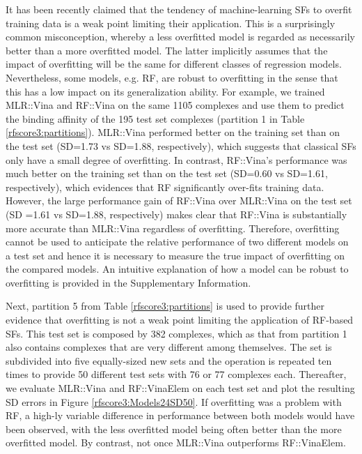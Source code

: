 It has been recently claimed \citep{1372} that the tendency of machine-learning SFs to overfit training data is a weak point limiting their application. This is a surprisingly common misconception, whereby a less overfitted model is regarded as necessarily better than a more overfitted model. The latter implicitly assumes that the impact of overfitting will be the same for different classes of regression models. Nevertheless, some models, e.g. RF, are robust to overfitting in the sense that this has a low impact on its generalization ability. For example, we trained MLR::Vina and RF::Vina on the same 1105 complexes and use them to predict the binding affinity of the 195 test set complexes (partition 1 in Table \ref{rfscore3:partitions}). MLR::Vina performed better on the training set than on the test set (SD=1.73 vs SD=1.88, respectively), which suggests that classical SFs only have a small degree of overfitting. In contrast, RF::Vina's performance was much better on the training set than on the test set (SD=0.60 vs SD=1.61, respectively), which evidences that RF significantly over-fits training data. However, the large performance gain of RF::Vina over MLR::Vina on the test set (SD =1.61 vs SD=1.88, respectively) makes clear that RF::Vina is substantially more accurate than MLR::Vina regardless of overfitting. Therefore, overfitting cannot be used to anticipate the relative performance of two different models on a test set and hence it is necessary to measure the true impact of overfitting on the compared models. An intuitive explanation of how a model can be robust to overfitting is provided in the Supplementary Information.

Next, partition 5 from Table \ref{rfscore3:partitions} is used to provide further evidence that overfitting is not a weak point limiting the application of RF-based SFs. This test set is composed by 382 complexes, which as that from partition 1 also contains complexes that are very different among themselves. The set is subdivided into five equally-sized new sets and the operation is repeated ten times to provide 50 different test sets with 76 or 77 complexes each. Thereafter, we evaluate MLR::Vina and RF::VinaElem on each test set and plot the resulting SD errors in Figure \ref{rfscore3:Models24SD50}. If overfitting was a problem with RF, a high-ly variable difference in performance between both models would have been observed, with the less overfitted model being often better than the more overfitted model. By contrast, not once MLR::Vina outperforms RF::VinaElem. 


